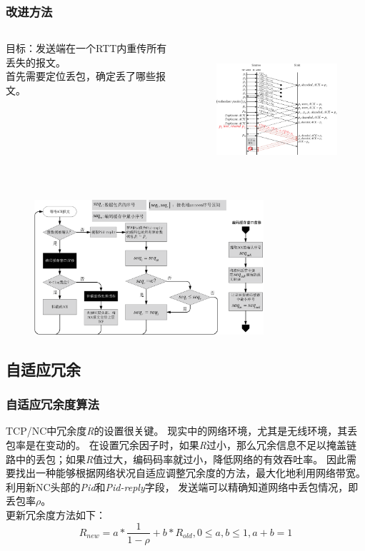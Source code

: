\begin{frame}
	\frametitle{改进方法}
	\begin{columns}
	\begin{column}{0.5\textwidth}
		目标：发送端在一个RTT内重传所有丢失的报文。
		\\
		首先需要定位丢包，确定丢了哪些报文。
	\end{column}
	\hspace{2em}
	\begin{column}{0.5\textwidth}
		\begin{figure}
			\includegraphics[height=5cm]{../figures/newfr.eps}
			\label{改进重传机制}
		\end{figure}
	\end{column}
	\end{columns}
\end{frame}
\begin{frame}
	\begin{figure}
		\includegraphics[height=5cm]{../figures/fr-rcvack.eps}
	\end{figure}
\end{frame}



\subsection{自适应冗余}
\begin{frame}
	\frametitle{自适应冗余度算法}
	TCP/NC中冗余度\emph{R}的设置很关键。
	现实中的网络环境，尤其是无线环境，其丢包率是在变动的。
	在设置冗余因子时，如果\emph{R}过小，那么冗余信息不足以掩盖链路中的丢包；如果\emph{R}值过大，编码码率就过小，降低网络的有效吞吐率。
	因此需要找出一种能够根据网络状况自适应调整冗余度的方法，最大化地利用网络带宽。
	\\
	\vspace{1em}
	利用新NC头部的\emph{Pid}和\emph{Pid-reply}字段，
	发送端可以精确知道网络中丢包情况，即丢包率$\rho$。
	\\
	更新冗余度方法如下：
	\begin{equation}
	R_{new}=a*\frac{1}{1-\rho}+b*R_{old},0 \le a,b \le 1,a+b=1
	\end{equation}
\end{frame}

